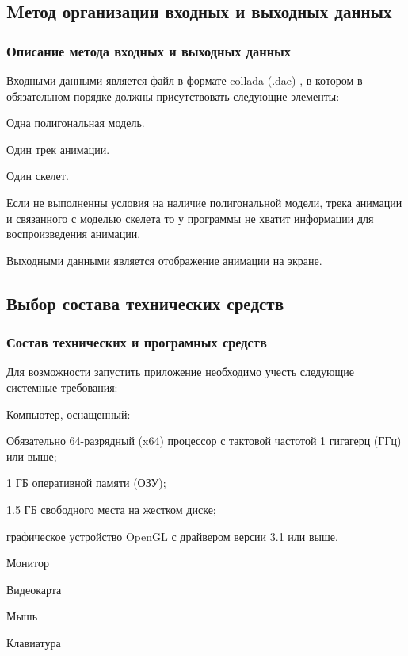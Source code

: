 \subsection{Mетод организации входных и выходных данных}

\subsubsection{Описание метода входных и выходных данных}
Входными данными является файл в формате collada (.dae)
, в котором в обязательном порядке должны присутствовать следующие элементы:
\begin{my_enumerate}
\item Одна полигональная модель.
\item Один трек анимации.
\item Один скелет.
\end{my_enumerate}

Если не выполненны условия на наличие полигональной модели,
трека анимации и связанного с моделью скелета то
у программы не хватит информации для воспроизведения анимации.

Выходными данными является отображение анимации на экране.


\subsection{Выбор состава технических средств}

\subsubsection{Состав технических и програмных средств}
Для возможности запустить приложение необходимо учесть следующие системные требования:
\begin{my_enumerate}
\item Компьютер, оснащенный:
    \begin{my_enumerate}
    \item Обязательно 64-разрядный (x64) процессор с тактовой частотой 1 гигагерц (ГГц) или выше;
    \item 1 ГБ оперативной памяти (ОЗУ);
    \item 1.5 ГБ свободного места на жестком диске;
    \item графическое устройство OpenGL с драйвером версии 3.1 или выше.
    \end{my_enumerate}
\item Монитор
\item Видеокарта
\item Мышь
\item Клавиатура
\end{my_enumerate}
\bigskip

